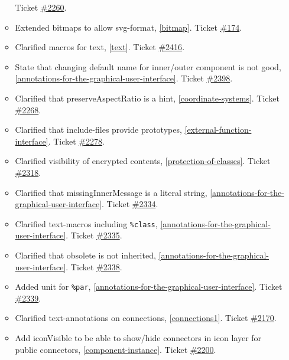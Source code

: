 \begin{itemize}
\begin{itemize}
Ticket \href{https://github.com/modelica/ModelicaSpecification/issues/2260}{\#2260}.
\item Extended bitmaps to allow svg-format, \cref{bitmap}.
Ticket \href{https://github.com/modelica/ModelicaSpecification/issues/174}{\#174}.
\item Clarified macros for text, \cref{text}.
Ticket \href{https://github.com/modelica/ModelicaSpecification/issues/2416}{\#2416}.
\item State that changing default name for inner/outer component is not good, \cref{annotations-for-the-graphical-user-interface}.
Ticket \href{https://github.com/modelica/ModelicaSpecification/issues/2398}{\#2398}.
\item Clarified that preserveAspectRatio is a hint, \cref{coordinate-systems}.
Ticket \href{https://github.com/modelica/ModelicaSpecification/issues/2268}{\#2268}.
\item Clarified that include-files provide prototypes, \cref{external-function-interface}.
Ticket \href{https://github.com/modelica/ModelicaSpecification/issues/2278}{\#2278}.
\item Clarified visibility of encrypted contents, \cref{protection-of-classes}.
Ticket \href{https://github.com/modelica/ModelicaSpecification/issues/2318}{\#2318}.
\item Clarified that missingInnerMessage is a literal string, \cref{annotations-for-the-graphical-user-interface}.
Ticket \href{https://github.com/modelica/ModelicaSpecification/issues/2334}{\#2334}.
\item Clarified text-macros including \lstinline!%class!, \cref{annotations-for-the-graphical-user-interface}.
Ticket \href{https://github.com/modelica/ModelicaSpecification/issues/2335}{\#2335}.
\item Clarified that obsolete is not inherited, \cref{annotations-for-the-graphical-user-interface}.
Ticket \href{https://github.com/modelica/ModelicaSpecification/issues/2338}{\#2338}.
\item Added unit for \lstinline!%par!, \cref{annotations-for-the-graphical-user-interface}.
Ticket \href{https://github.com/modelica/ModelicaSpecification/issues/2339}{\#2339}.
\item Clarified text-annotations on connections, \cref{connections1}.
Ticket \href{https://github.com/modelica/ModelicaSpecification/issues/2170}{\#2170}.
\item Add iconVisible to be able to show/hide connectors in icon layer for public connectors, \cref{component-instance}.
Ticket \href{https://github.com/modelica/ModelicaSpecification/issues/2200}{\#2200}.

\end{itemize}
\end{itemize}
